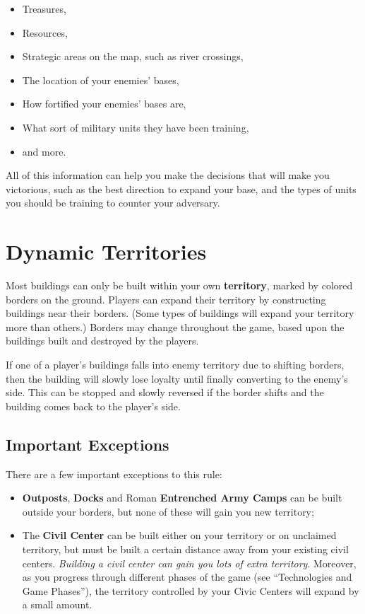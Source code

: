\documentclass[a4paper,titlepage]{article}
\begin{document}
\begin{itemize}
\item Treasures,
\item Resources,
\item Strategic areas on the map, such as river crossings,
\item The location of your enemies’ bases,
\item How fortified your enemies’ bases are,
\item What sort of military units they have been training,
\item and more.
\end{itemize}

All of this information can help you make the decisions that will make you victorious, such as the best direction to expand your base, and the types of units you should be training to counter your adversary.

\clearpage

\section{Dynamic Territories}

Most buildings can only be built within your own \textbf{territory}, marked by colored borders on the ground. Players can expand their territory by constructing buildings near their borders. (Some types of buildings will expand your territory more than others.) Borders may change throughout the game, based upon the buildings built and destroyed by the players.

If one of a player’s buildings falls into enemy territory due to shifting borders, then the building will slowly lose loyalty until finally converting to the enemy’s side. This can be stopped and slowly reversed if the border shifts and the building comes back to the player’s side.

\subsection*{Important Exceptions}

There are a few important exceptions to this rule:

\begin{itemize}
\item \textbf{Outposts}, \textbf{Docks} and Roman \textbf{Entrenched Army Camps} can be built outside your borders, but none of these will gain you new territory;
\item The \textbf{Civil Center} can be built either on your territory or on unclaimed territory, but must be built a certain distance away from your existing civil centers. \emph{Building a civil center can gain you lots of extra territory}. Moreover, as you progress through different phases of the game (see “Technologies and Game Phases”), the territory controlled by your Civic Centers will expand by a small amount.
\end{itemize}
\end{document}
